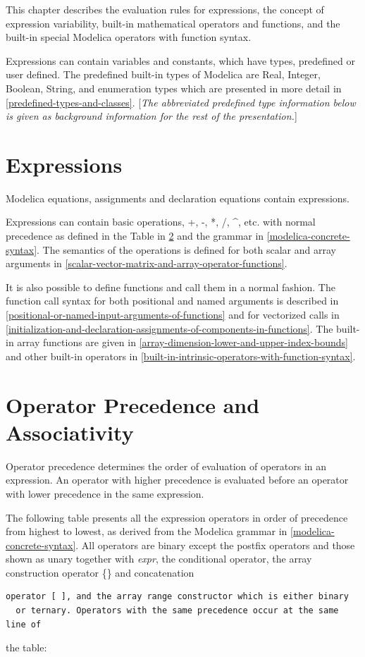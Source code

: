 \documentclass[10pt,a4paper]{report}
\def\doublelabel#1{\label{#1}\hypertarget{#1}{}}
\begin{document}
This chapter describes the evaluation rules for expressions, the concept
of expression variability, built-in mathematical operators and
functions, and the built-in special Modelica operators with function
syntax.

Expressions can contain variables and constants, which have types,
predefined or user defined. The predefined built-in types of Modelica
are Real, Integer, Boolean, String, and enumeration types which are
presented in more detail in \ref{predefined-types-and-classes}. {[}\emph{The abbreviated
predefined type information below is given as background information for
the rest of the presentation.}{]}

\section{Expressions}\doublelabel{expressions}

Modelica equations, assignments and declaration equations contain
expressions.

Expressions can contain basic operations, +, -, *, /, \^{}, etc. with
normal precedence as defined in the Table in \ref{operator-precedence-and-associativity} and the grammar
in \ref{modelica-concrete-syntax}. The semantics of the operations is defined for both
scalar and array arguments in \ref{scalar-vector-matrix-and-array-operator-functions}.

It is also possible to define functions and call them in a normal
fashion. The function call syntax for both positional and named
arguments is described in \ref{positional-or-named-input-arguments-of-functions} and for vectorized calls in
\ref{initialization-and-declaration-assignments-of-components-in-functions}. The built-in array functions are given in \ref{array-dimension-lower-and-upper-index-bounds}
and other built-in operators in \ref{built-in-intrinsic-operators-with-function-syntax}.

\section{Operator Precedence and Associativity}\doublelabel{operator-precedence-and-associativity}

Operator precedence determines the order of evaluation of operators in
an expression. An operator with higher precedence is evaluated before an
operator with lower precedence in the same expression.

The following table presents all the expression operators in order of
precedence from highest to lowest, as derived from the Modelica grammar
in \ref{modelica-concrete-syntax}. All operators are binary except the postfix operators and
those shown as unary together with \emph{expr}, the conditional
operator, the array construction operator \{\} and concatenation
\begin{lstlisting}[language=modelica]
operator [ ], and the array range constructor which is either binary
  or ternary. Operators with the same precedence occur at the same line of
\end{lstlisting}
the table:
\end{document}
